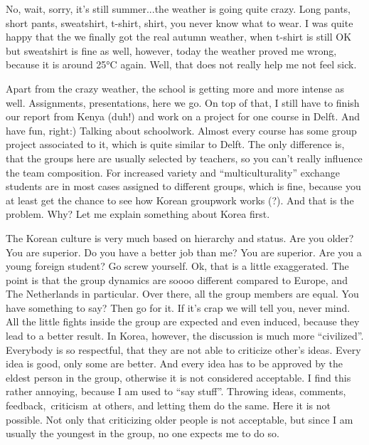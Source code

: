 \begin{post}
	\begin{content}
No, wait, sorry, it's still summer...the weather is going quite crazy. Long pants, short pants, sweatshirt, t-shirt, shirt, you never know what to wear. I was quite happy that the we finally got the real autumn weather, when t-shirt is still OK but sweatshirt is fine as well, however, today the weather proved me wrong, because it is around 25°C again. Well, that does not really help me not feel sick.

Apart from the crazy weather, the school is getting more and more intense as well. Assignments, presentations, here we go. On top of that, I still have to finish our report from Kenya (duh!) and work on a project for one course in Delft. And have fun, right:) Talking about schoolwork. Almost every course has some group project associated to it, which is quite similar to Delft. The only difference is, that the groups here are usually selected by teachers, so you can't really influence the team composition. For increased variety and ``multiculturality'' exchange students are in most cases assigned to different groups, which is fine, because you at least get the chance to see how Korean groupwork works (?). And that is the problem. Why? Let me explain something about Korea first.

The Korean culture is very much based on hierarchy and status. Are you older? You are superior. Do you have a better job than me? You are superior. Are you a young foreign student? Go screw yourself. Ok, that is a little exaggerated. The point is that the group dynamics are soooo different compared to Europe, and The Netherlands in particular. Over there, all the group members are equal. You have something to say? Then go for it. If it's crap we will tell you, never mind. All the little fights inside the group are expected and even induced, because they lead to a better result. In Korea, however, the discussion is much more ``civilized''. Everybody is so respectful, that they are not able to criticize other's ideas. Every idea is good, only some are better. And every idea has to be approved by the eldest person in the group, otherwise it is not considered acceptable. I find this rather annoying, because I am used to ``say stuff''. Throwing ideas, comments, feedback, criticism at others, and letting them do the same. Here it is not possible. Not only that criticizing older people is not acceptable, but since I am usually the youngest in the group, no one expects me to do so.


\end{content}
\end{post}
